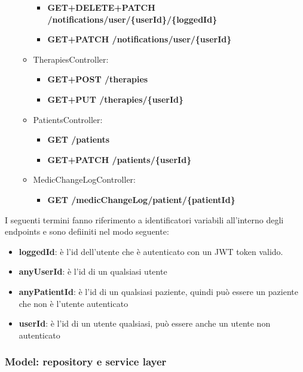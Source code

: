 \documentclass[a4paper]{article}
\begin{document}
\begin{itemize}
\begin{itemize}
\begin{itemize}
      \item \textbf{GET+DELETE+PATCH /notifications/user/\{userId\}/\{loggedId\}}
      \item \textbf{GET+PATCH /notifications/user/\{userId\}}
    \end{itemize}
    \item TherapiesController:
    \begin{itemize}
      \item \textbf{GET+POST /therapies}
      \item \textbf{GET+PUT /therapies/\{userId\}}
    \end{itemize}
    \item PatientsController:
    \begin{itemize}
      \item \textbf{GET /patients}
      \item \textbf{GET+PATCH /patients/\{userId\}}
    \end{itemize}
    \item MedicChangeLogController:
    \begin{itemize}
      \item \textbf{GET /medicChangeLog/patient/\{patientId\}}
    \end{itemize}
  \end{itemize}
\end{itemize}
\noindent
I seguenti termini fanno riferimento a identificatori variabili all'interno degli endpoints
e sono defiiniti nel modo seguente:
\begin{itemize}
  \item \textbf{loggedId}: è l'id dell'utente che è autenticato
  con un JWT token valido.
  \item \textbf{anyUserId}: è l'id di un qualsiasi utente
  \item \textbf{anyPatientId}: è l'id di un qualsiasi paziente, quindi può 
  essere un paziente che non è l'utente autenticato
  \item \textbf{userId}: è l'id di un utente qualsiasi, può essere anche un utente non autenticato
\end{itemize}

\subsubsection{Model: repository e service layer}
\end{document}
